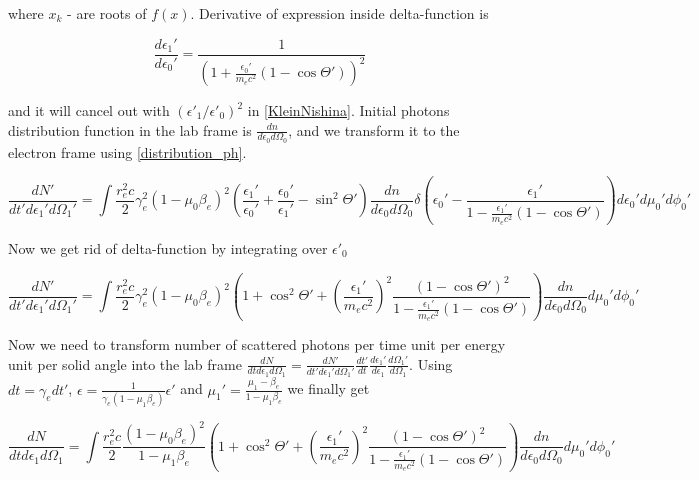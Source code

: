 where $x_k$ - are roots of $f(x)$. Derivative of expression inside delta-function is

\begin{equation}
	\frac{d\epsilon_1'}{d\epsilon_0'}=\frac{1}{(1+\frac{\epsilon_0'}{m_e c^2}(1 - \cos \Theta'))^2}
\end{equation}

and it will cancel out with $\left(\epsilon'_1/\epsilon'_0\right)^2$ in \ref{KleinNishina}. Initial photons distribution function in the lab frame is $\frac{dn}{d \epsilon_0 d \Omega_0}$, and we transform it to the electron frame using \ref{distribution_ph}.

\begin{equation}
	\frac{dN'}{dt'd\epsilon_1'd\Omega_1'}=\int \frac{r_e^2 c}{2} \gamma_e^2 (1 - \mu_0 \beta_e)^2 \left(\frac{\epsilon_1'}{\epsilon_0'}+\frac{\epsilon_0'}{\epsilon_1'}-\sin^2\Theta'\right)\frac{dn}{d\epsilon_0 d\Omega_0} \delta\left(\epsilon_0' - \frac{\epsilon_1'}{1-\frac{\epsilon_1'}{m_e c^2}(1 - \cos \Theta')}\right) d\epsilon_0'd\mu_0' d\phi_0'
\end{equation}

Now we get rid of delta-function by integrating over $\epsilon'_0$

\begin{equation}
	\frac{dN'}{dt'd\epsilon_1'd\Omega_1'}=\int \frac{r_e^2 c}{2} \gamma_e^2 (1 - \mu_0 \beta_e)^2 \left(1 + \cos^2\Theta'+\left(\frac{\epsilon_1'}{m_e c^2}\right)^2\frac{(1-\cos\Theta')^2}{1-\frac{\epsilon_1'}{m_e c^2}(1 - \cos \Theta')}\right)\frac{dn}{d\epsilon_0 d\Omega_0}d\mu_0' d\phi_0'
\end{equation}

Now we need to transform number of scattered photons per time unit per energy unit per solid angle into the lab frame
$\frac{dN}{dt d\epsilon_1 d\Omega_1} = \frac{dN'}{dt' d\epsilon_1' d\Omega_1'}\frac{dt'}{dt}\frac{d\epsilon_1'}{d\epsilon_1}\frac{d\Omega_1'}{d\Omega_1}$. Using $dt = \gamma_e dt'$, $\epsilon = \frac{1}{\gamma_e(1 -\mu_1\beta_e)}\epsilon'$ and $\mu_1' = \frac{\mu_1-\beta_e}{1-\mu_1 \beta_e}$ we finally get

\begin{equation} \label{compton_elframe}
	\frac{dN}{dt d\epsilon_1 d\Omega_1}=\int \frac{r_e^2 c}{2} \frac{(1 - \mu_0 \beta_e)^2}{1-\mu_1\beta_e} \left(1 + \cos^2\Theta'+\left(\frac{\epsilon_1'}{m_e c^2}\right)^2\frac{(1-\cos\Theta')^2}{1-\frac{\epsilon_1'}{m_e c^2}(1 - \cos \Theta')}\right)\frac{dn}{d\epsilon_0 d\Omega_0}d\mu_0' d\phi_0'	
\end{equation}

